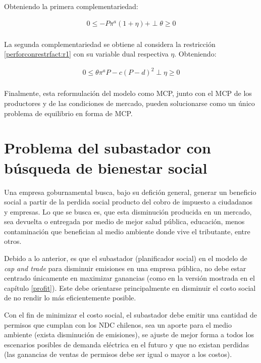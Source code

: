 Obteniendo la primera complementariedad:

\begin{equation}
\begin{array}{rrclcl}
    0\leq -P\pi^a(1+\eta)+ \perp \theta \geq 0 \label{compllag3}\\
\end{array}
\end{equation}

La segunda complementariedad se obtiene al considera la restricción \ref{perforconrestrfact:r1} con su variable dual respectiva $\eta$. Obteniendo:

\begin{equation}
\begin{array}{rrclcl}
    0 \leq \theta \pi^a P - c(P-d)^2 \perp \eta \geq 0 \label{compllag31}\\
\end{array}
\end{equation}

Finalmente, esta reformulación del modelo como MCP, junto con el MCP de los productores y de las condiciones de mercado, pueden solucionarse como un único problema de equilibrio en forma de MCP.


\section{Problema del subastador con búsqueda de bienestar social}\label{bienestarsocial}

Una empresa goburnamental busca, bajo su defición general, generar un beneficio social a partir de la perdida social producto del cobro de impuesto a ciudadanos y empresas. Lo que se busca es, que esta disminución producida en un mercado, sea devuelta o entregada por medio de mejor salud pública, educación, menos contaminación que benefician al medio ambiente donde vive el tributante, entre otros. 
\vspace{2.5mm}

Debido a lo anterior, es que el subastador (planificador social) en el modelo de \textit{cap and trade} para disminuir emisiones en una empresa pública, no debe estar centrado únicamente en maximizar ganancias (como en la versión mostrada en el capítulo \ref{profit}). Este debe orientarse principalmente en disminuir el costo social de no rendir lo más eficientemente posible.
\vspace{2.5mm}

Con el fin de minimizar el costo social, el subastador debe emitir una cantidad de permisos que cumplan con los NDC chilenos, sea un aporte para el medio ambiente (exista disminución de emisiones), se ajuste de mejor forma a todos los escenarios posibles de demanda eléctrica en el futuro y que no existan perdidas (las ganancias de ventas de permisos debe ser igual o mayor a los costos). 
\vspace{2.5mm}

